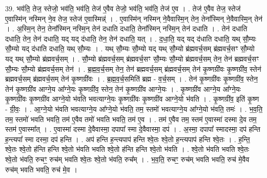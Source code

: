 \documentclass[17pt]{extarticle}
\begin{document}
39. भव॑ति॒ तेज॒ स्तेजो॒ भव॑ति॒ भव॑ति॒ तेज॑ ए॒वैव तेजो॒ भव॑ति॒ भव॑ति॒ तेज॑ ए॒व । . तेज॑ ए॒वैव तेज॒ स्तेज॑ ए॒वास्मि॑न् नस्मिन् ने॒व तेज॒ स्तेज॑ ए॒वास्मिन्न्॑ । . ए॒वास्मि॑न् नस्मिन् ने॒वैवास्मि॒न् तेन॒ तेना᳚स्मिन् ने॒वैवास्मि॒न् तेन॑ । . अ॒स्मि॒न् तेन॒ तेना᳚स्मिन् नस्मि॒न् तेन॑ दधाति दधाति॒ तेना᳚स्मिन् नस्मि॒न् तेन॑ दधाति । . तेन॑ दधाति दधाति॒ तेन॒ तेन॑ दधाति॒ यद् यद् द॑धाति॒ तेन॒ तेन॑ दधाति॒ यत् । . द॒धा॒ति॒ यद् यद् द॑धाति दधाति॒ यथ् सौ॒म्यः सौ॒म्यो यद् द॑धाति दधाति॒ यथ् सौ॒म्यः । . यथ् सौ॒म्यः सौ॒म्यो यद् यथ् सौ॒म्यो ब्र॑ह्मवर्च॒सम् ब्र॑ह्मवर्च॒सꣳ सौ॒म्यो यद् यथ् सौ॒म्यो ब्र॑ह्मवर्च॒सम् । . सौ॒म्यो ब्र॑ह्मवर्च॒सम् ब्र॑ह्मवर्च॒सꣳ सौ॒म्यः सौ॒म्यो ब्र॑ह्मवर्च॒सम् तेन॒ तेन॑ ब्रह्मवर्च॒सꣳ सौ॒म्यः सौ॒म्यो ब्र॑ह्मवर्च॒सम् तेन॑ । . ब्र॒ह्म॒व॒र्च॒सम् तेन॒ तेन॑ ब्रह्मवर्च॒सम् ब्र॑ह्मवर्च॒सम् तेन॑ कृ॒ष्णग्री॑वः कृ॒ष्णग्री॑व॒ स्तेन॑ ब्रह्मवर्च॒सम् ब्र॑ह्मवर्च॒सम् तेन॑ कृ॒ष्णग्री॑वः । . ब्र॒ह्म॒व॒र्च॒समिति॑ ब्रह्म - व॒र्च॒सम् । . तेन॑ कृ॒ष्णग्री॑वः कृ॒ष्णग्री॑व॒ स्तेन॒ तेन॑ कृ॒ष्णग्री॑व आग्ने॒य आ᳚ग्ने॒यः कृ॒ष्णग्री॑व॒ स्तेन॒ तेन॑ कृ॒ष्णग्री॑व आग्ने॒यः । . कृ॒ष्णग्री॑व आग्ने॒य आ᳚ग्ने॒यः कृ॒ष्णग्री॑वः कृ॒ष्णग्री॑व आग्ने॒यो भ॑वति भवत्याग्ने॒यः कृ॒ष्णग्री॑वः कृ॒ष्णग्री॑व आग्ने॒यो भ॑वति । . कृ॒ष्णग्री॑व॒ इति॑ कृ॒ष्ण - ग्री॒वः॒ । . आ॒ग्ने॒यो भ॑वति भवत्याग्ने॒य आ᳚ग्ने॒यो भ॑वति॒ तम॒ स्तमो॑ भवत्याग्ने॒य आ᳚ग्ने॒यो भ॑वति॒ तमः॑ । . भ॒व॒ति॒ तम॒ स्तमो॑ भवति भवति॒ तम॑ ए॒वैव तमो॑ भवति भवति॒ तम॑ ए॒व । . तम॑ ए॒वैव तम॒ स्तम॑ ए॒वास्मा॑ दस्मा दे॒व तम॒ स्तम॑ ए॒वास्मा᳚त् । . ए॒वास्मा॑ दस्मा दे॒वैवास्मा॒ दपापा᳚ स्मा दे॒वैवास्मा॒ दप॑ । . अ॒स्मा॒ दपापा᳚ स्मादस्मा॒ दप॑ हन्ति ह॒न्त्यपा᳚ स्मा दस्मा॒ दप॑ हन्ति । . अप॑ हन्ति ह॒न्त्यपाप॑ हन्ति श्वे॒तः श्वे॒तो ह॒न्त्यपाप॑ हन्ति श्वे॒तः । . ह॒न्ति॒ श्वे॒तः श्वे॒तो ह॑न्ति हन्ति श्वे॒तो भ॑वति भवति श्वे॒तो ह॑न्ति हन्ति श्वे॒तो भ॑वति । . श्वे॒तो भ॑वति भवति श्वे॒तः श्वे॒तो भ॑वति॒ रुचꣳ॒॒ रुच॑म् भवति श्वे॒तः श्वे॒तो भ॑वति॒ रुच᳚म् । . भ॒व॒ति॒ रुचꣳ॒॒ रुच॑म् भवति भवति॒ रुच॑ मे॒वैव रुच॑म् भवति भवति॒ रुच॑ मे॒व । \newline
\pagebreak
{}
\end{document}
